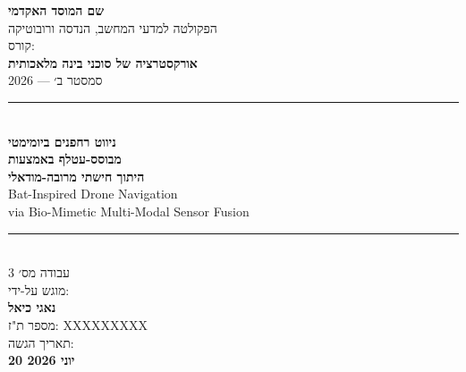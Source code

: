 
\begin{titlepage}
    \centering
    \vspace*{1.5cm}

    {\large\textbf{שם המוסד האקדמי}}\\[0.3em]
    {\normalsize הפקולטה למדעי המחשב, הנדסה ורובוטיקה}\\[1.5cm]

    {\normalsize קורס:}\\[0.2em]
    {\large\textbf{אורקסטרציה של סוכני בינה מלאכותית}}\\[0.2em]
    {\normalsize סמסטר ב׳ --- 2026}\\[1.5cm]

    \rule{\linewidth}{1pt}\\[0.5cm]

    {\LARGE\bfseries
        ניווט רחפנים ביומימטי\\[0.4em]
        מבוסס-עטלף באמצעות\\[0.4em]
        היתוך חישתי מרובה-מודאלי
    }\\[0.4em]
    {\large\foreignlanguage{english}{%
        Bat-Inspired Drone Navigation\\[0.2em]
        via Bio-Mimetic Multi-Modal Sensor Fusion%
    }}\\[0.3em]

    \rule{\linewidth}{1pt}\\[1.5cm]

    {\large עבודה מס׳ 3}\\[2cm]

    {\normalsize מוגש על-ידי:}\\[0.5em]
    {\large\textbf{נאגי כיאל}}\\[0.2em]
    {\normalsize מספר ת"ז: XXXXXXXXX}\\[1cm]

    \vfill
    {\normalsize תאריך הגשה:}\\[0.2em]
    {\large\textbf{20 יוני 2026}}\\[1cm]
\end{titlepage}
